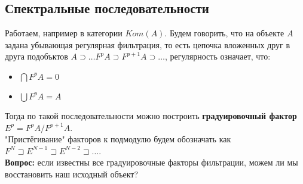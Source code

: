 \documentclass[../main.tex]{subfiles}
\begin{document}
\subsection{Спектральные последовательности}
Работаем, например в категории $Kom(A)$. Будем говорить, что на объекте $A$ задана убывающая регулярная фильтрация, то есть цепочка вложенных друг в друга подобъктов $A \supset \ldots F^p A \supset F^{p+1}A \supset \ldots$, регулярность означает, что:
\begin{itemize}
    \item $\bigcap F^p A = 0$ \item  $\bigcup F^p A = A$
\end{itemize}
Тогда по такой последовательности можно построить \textbf{градуировочный фактор} $E^p = F^p A / F^{p+1} A$.\\
"Пристёгивание" факторов к подмодулю будем обозначать как $F^N \sqsupset E^{N-1} \sqsupset E^{N-2}\sqsupset\ldots$.\\
\textbf{Вопрос:} если известны все градуировочные факторы фильтрации, можем ли мы восстановить наш исходный объект?
\end{document}
